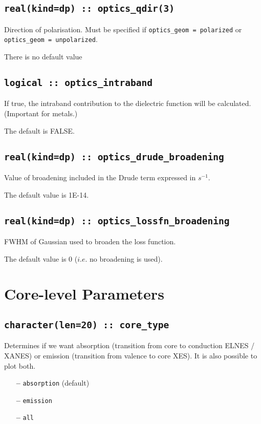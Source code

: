 \documentclass[a4paper,11pt,twoside]{book}
\begin{document}
{\subsection[optics\_qdir]{\tt real(kind=dp) :: optics\_qdir(3)}
Direction of polarisation. Must be specified if \verb#optics_geom = polarized#
or \verb#optics_geom = unpolarized#.

There is no default value

\subsection[optics\_intraband]{\tt logical :: optics\_intraband}
If true, the intraband contribution to the dielectric function will be calculated.  (Important for metals.)

The default is FALSE.

\subsection[optics\_drude\_broadening]{\tt real(kind=dp) :: optics\_drude\_broadening}
Value of broadening included in the Drude term expressed in $s^{-1}$.

The default value is 1E-14.

\subsection[optics\_lossfn\_broadening]{\tt real(kind=dp) :: optics\_lossfn\_broadening}
FWHM of Gaussian used to broaden the loss function.

The default value is 0 ($i.e.$ no broadening is used).


\section{Core-level Parameters}

\subsection[core\_geom]{\tt character(len=20) :: core\_type}

Determines if we want absorption (transition from core to conduction
ELNES / XANES)
or emission (transition from valence to core XES). It is also possible
to plot both.
\begin{itemize}
\item[{\bf --}]  \verb#absorption# (default)
\item[{\bf --}]  \verb#emission#
\item[{\bf --}]  \verb#all#
\end{itemize}

}
\end{document}
